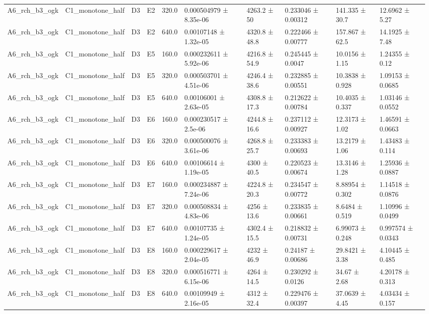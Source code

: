 \begin{table}
\begin{tabular}{llllllllll}
A6\_rch\_b3\_ogk & C1\_monotone\_half & D3 & E2 & 320.0 & 0.000504979 ± 8.35e-06 & 4263.2 ± 50 & 0.233046 ± 0.00312 & 141.335 ± 30.7 & 12.6962 ± 5.27 \\
A6\_rch\_b3\_ogk & C1\_monotone\_half & D3 & E2 & 640.0 & 0.00107148 ± 1.32e-05 & 4320.8 ± 48.8 & 0.222466 ± 0.00777 & 157.867 ± 62.5 & 14.1925 ± 7.48 \\
A6\_rch\_b3\_ogk & C1\_monotone\_half & D3 & E5 & 160.0 & 0.000232611 ± 5.92e-06 & 4216.8 ± 54.9 & 0.245445 ± 0.0047 & 10.0156 ± 1.15 & 1.24355 ± 0.12 \\
A6\_rch\_b3\_ogk & C1\_monotone\_half & D3 & E5 & 320.0 & 0.000503701 ± 4.51e-06 & 4246.4 ± 38.6 & 0.232885 ± 0.00551 & 10.3838 ± 0.928 & 1.09153 ± 0.0685 \\
A6\_rch\_b3\_ogk & C1\_monotone\_half & D3 & E5 & 640.0 & 0.00106001 ± 2.63e-05 & 4308.8 ± 17.3 & 0.212622 ± 0.00784 & 10.4035 ± 0.337 & 1.03146 ± 0.0552 \\
A6\_rch\_b3\_ogk & C1\_monotone\_half & D3 & E6 & 160.0 & 0.000230517 ± 2.5e-06 & 4244.8 ± 16.6 & 0.237112 ± 0.00927 & 12.3173 ± 1.02 & 1.46591 ± 0.0663 \\
A6\_rch\_b3\_ogk & C1\_monotone\_half & D3 & E6 & 320.0 & 0.000500076 ± 3.61e-06 & 4268.8 ± 25.7 & 0.233383 ± 0.00693 & 13.2179 ± 1.06 & 1.43483 ± 0.114 \\
A6\_rch\_b3\_ogk & C1\_monotone\_half & D3 & E6 & 640.0 & 0.00106614 ± 1.19e-05 & 4300 ± 40.5 & 0.220523 ± 0.00674 & 13.3146 ± 1.28 & 1.25936 ± 0.0887 \\
A6\_rch\_b3\_ogk & C1\_monotone\_half & D3 & E7 & 160.0 & 0.000234887 ± 7.24e-06 & 4224.8 ± 20.3 & 0.234547 ± 0.00772 & 8.88954 ± 0.302 & 1.14518 ± 0.0876 \\
A6\_rch\_b3\_ogk & C1\_monotone\_half & D3 & E7 & 320.0 & 0.000508834 ± 4.83e-06 & 4256 ± 13.6 & 0.233835 ± 0.00661 & 8.6484 ± 0.519 & 1.10996 ± 0.0499 \\
A6\_rch\_b3\_ogk & C1\_monotone\_half & D3 & E7 & 640.0 & 0.00107735 ± 1.24e-05 & 4302.4 ± 15.5 & 0.218832 ± 0.00731 & 6.99073 ± 0.248 & 0.997574 ± 0.0343 \\
A6\_rch\_b3\_ogk & C1\_monotone\_half & D3 & E8 & 160.0 & 0.000229617 ± 2.04e-05 & 4232 ± 46.9 & 0.24187 ± 0.00686 & 29.8421 ± 3.38 & 4.10445 ± 0.485 \\
A6\_rch\_b3\_ogk & C1\_monotone\_half & D3 & E8 & 320.0 & 0.000516771 ± 6.15e-06 & 4264 ± 14.5 & 0.230292 ± 0.0126 & 34.67 ± 2.68 & 4.20178 ± 0.313 \\
A6\_rch\_b3\_ogk & C1\_monotone\_half & D3 & E8 & 640.0 & 0.00109949 ± 2.16e-05 & 4312 ± 32.4 & 0.229476 ± 0.00397 & 37.0639 ± 4.45 & 4.03434 ± 0.157 \\

\end{tabular}
\end{table}
